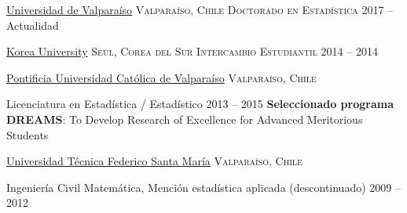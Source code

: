 \documentclass[10pt,a4paper]{article}
\begin{document}


\headedsection %
{\href{https://ideuv.uv.cl/index.php/es/?view=page&id=91}{Universidad de Valparaíso}}
{\textsc{Valparaíso, Chile}}
 {
\headedsubsection %
{\textsc{Doctorado en Estadística}}
{2017 -- Actualidad}
{}
}



\headedsection %
{\href{http://www.korea.ac.kr}{Korea University}}
{\textsc{Seúl, Corea del Sur}}
 {
\headedsubsection %
{\textsc{Intercambio Estudiantil}}
{2014 -- 2014}
{}
}


\headedsection %
{\href{http://www.pucv.cl}{Pontificia Universidad Cat\'olica de Valpara\'iso}}
{\textsc{Valpara\'iso, Chile}} {

\headedsubsection %
{Licenciatura en Estadística / Estadístico}
{2013 -- 2015}
{\textbf{Seleccionado programa DREAMS}: To
Develop Research of Excellence for Advanced Meritorious Students}
}




\headedsection
{\href{http://www.usm.cl}{Universidad T\'ecnica Federico Santa Mar\'ia}}
{\textsc{Valpara\'iso, Chile}} {

\headedsubsection 
{Ingeniería Civil Matemática, \textnormal{Mención estadística aplicada (descontinuado)}}
{2009 -- 2012} {}
}

\end{document}
